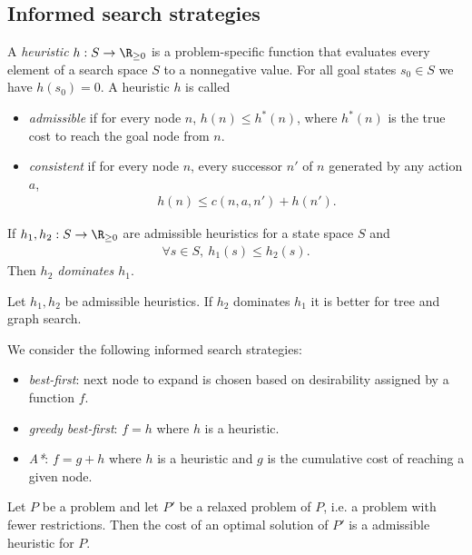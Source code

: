 \documentclass{article}
\begin{document}
\subsection{Informed search strategies}

\begin{definition}[R\&N p. 92]
    A \emph{heuristic} $h:S\to \R_{\geq 0}$ is a problem-specific function
    that evaluates every element of a search space $S$ to a nonnegative value.
    For all goal states $s_0\in S$ we have $h(s_0)=0$.
    A heuristic $h$ is called
    \begin{itemize}
        \item \emph{admissible} if for every node $n$, $h(n)\leq h^*(n)$,
        where $h^*(n)$ is the true cost to reach the goal node from $n$.
        \item \emph{consistent} if for every node $n$, every
        successor $n'$ of $n$ generated by any action $a$,
        \begin{align*}
            h(n) \leq c(n, a, n') + h(n').
        \end{align*}
    \end{itemize}
    If $h_1,h_2:S\to \R_{\geq 0}$ are admissible heuristics for a state
    space $S$ and
    \begin{align*}
        \forall s\in S,\: h_1(s) \leq h_2(s).
    \end{align*}
    Then \emph{$h_2$ dominates $h_1$}.
\end{definition}

\begin{theorem}
    Let $h_1,h_2$ be admissible heuristics. If $h_2$ dominates $h_1$ it is
    better for tree and graph search.
\end{theorem}

\begin{definition}
    We consider the following informed search strategies:
    \begin{itemize}
        \item \emph{best-first}: next node to expand is chosen based on desirability assigned by a function $f$.
        \item \emph{greedy best-first}: $f=h$ where $h$ is a heuristic.
        \item \emph{A*}: $f=g+h$ where $h$ is a heuristic and $g$ is the cumulative cost of reaching a given node.
    \end{itemize}
\end{definition}

\begin{theorem}
    Let $P$ be a problem and let $P'$ be a relaxed problem of $P$, i.e.
    a problem with fewer restrictions. Then the cost of an optimal solution of 
    $P'$ is a admissible heuristic for $P$.
\end{theorem}
\end{document}
